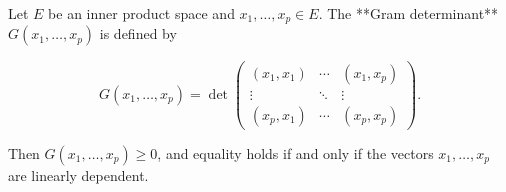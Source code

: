 Let \(E\) be an inner product space and \(x_1, \ldots, x_p \in E\). The **Gram determinant** \(G(x_1, \ldots, x_p)\) is defined by

$$G(x_1, \ldots, x_p) = \det \begin{pmatrix}
(x_1, x_1) & \cdots & (x_1, x_p) \\
\vdots & \ddots & \vdots \\
(x_p, x_1) & \cdots & (x_p, x_p)
\end{pmatrix}.$$

Then \(G(x_1, \ldots, x_p) \geq 0\), and equality holds if and only if the vectors \(x_1, \ldots, x_p\) are linearly dependent.

